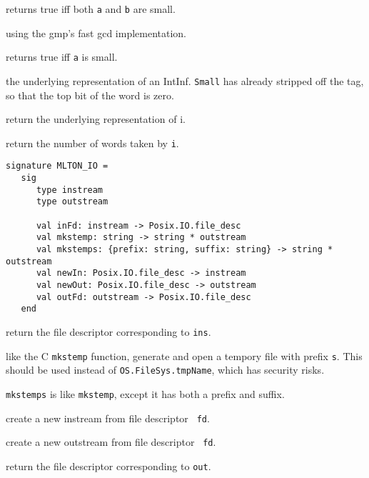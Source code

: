\begin{description}
returns true iff both {\tt a} and {\tt b} are small.

using the gmp's fast gcd implementation.

returns true iff {\tt a} is small.

the underlying representation of an IntInf.  {\tt Small} has already stripped
off the tag, so that the top bit of the word is zero.

return the underlying representation of i.

return the number of words taken by {\tt i}.

\end{description}


\begin{verbatim}
signature MLTON_IO =
   sig
      type instream
      type outstream

      val inFd: instream -> Posix.IO.file_desc
      val mkstemp: string -> string * outstream
      val mkstemps: {prefix: string, suffix: string} -> string * outstream
      val newIn: Posix.IO.file_desc -> instream
      val newOut: Posix.IO.file_desc -> outstream
      val outFd: outstream -> Posix.IO.file_desc
   end
\end{verbatim}

\begin{description}

 return the file descriptor corresponding to {\tt ins}.

like the C {\tt mkstemp} function, generate and open a tempory file with prefix
{\tt s}.  This should be used instead of {\tt OS.FileSys.tmpName}, which has
security risks.

{\tt mkstemps} is like {\tt mkstemp}, except it has both a prefix and suffix.

 create a new instream from file descriptor {\tt 
fd}.

 create a new outstream from file descriptor {\tt 
fd}.

 return the file descriptor corresponding to
{\tt out}.
\end{description}


